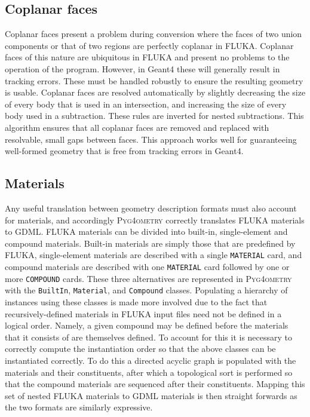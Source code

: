 \documentclass[final,5p,times,twocolumn]{elsarticle}
\newcommand{\pyinline}[1]{\lstinline[postbreak={}]{#1}}
\newcommand{\fluka}[1]{\texttt{\MakeUppercase{#1}}}
\newcommand{\PYGEOMETRY}{\textsc{Pyg4ometry}}
\begin{document}
\subsection{Coplanar faces}
Coplanar faces present a problem during conversion where the faces of two
union components or that of two regions are perfectly coplanar in FLUKA.
Coplanar faces of this nature are ubiquitous in FLUKA and present no
problems to the operation of the program.  However, in Geant4 these will
generally result in tracking errors.  These must be handled robustly to
ensure the resulting geometry is usable.  Coplanar faces are resolved
automatically by slightly decreasing the size of every body that is used in
an intersection, and increasing the size of every body used in a
subtraction.  These rules are inverted for nested subtractions.  This
algorithm ensures that all coplanar faces are removed and replaced with
resolvable, small gaps between faces.  This approach works well for
guaranteeing well-formed geometry that is free from tracking errors in Geant4.

\subsection{Materials}

Any useful translation between geometry description formats must also
account for materials, and accordingly \PYGEOMETRY{} correctly translates
FLUKA materials to GDML.  FLUKA materials can be divided into built-in,
single-element and compound materials.  Built-in materials are simply those
that are predefined by FLUKA, single-element materials are described with a
single \fluka{material} card, and compound materials are described with one
\fluka{material} card followed by one or more \fluka{compound} cards.
These three alternatives are represented in \PYGEOMETRY{} with the
\pyinline{BuiltIn}, \pyinline{Material}, and \pyinline{Compound} classes.
Populating a hierarchy of instances using these classes is made more involved due to
the fact that recursively-defined materials in FLUKA input files need not
be defined in a logical order.  Namely, a given compound may be
defined before the materials that it consists of are themselves defined.
To account for this it is necessary to correctly compute the instantiation
order so that the above classes can be instantiated correctly.  To do this
a directed acyclic graph is populated with the materials and their
constituents, after which a topological sort is performed so that the
compound materials are sequenced after their constituents.  Mapping this
set of nested FLUKA materials to GDML materials is then
straight forwards as the two formats are similarly expressive.
\end{document}
